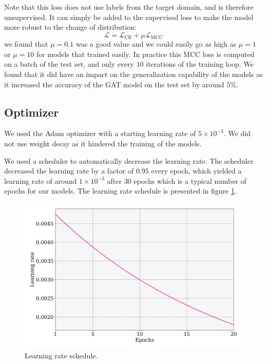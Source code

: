 \documentclass[switch, 11pt]{article}
\begin{document}
\begin{multicols}{2}
    Note that this loss does not use labels from the target domain, and is therefore unsupervised. It can simply be added to the supervised loss to make the model more robust to the change of distribution:
    \begin{equation}
        \mathcal{L} = \mathcal{L}_{\text{CE}} + \mu\mathcal{L}_{\text{MCC}}
    \end{equation}
    we found that $\mu=0.1$ was a good value and we could easily go as high as $\mu=1$ or $\mu=10$ for models that trained easily. In practice this MCC loss is computed on a batch of the test set, and only every $10$ iterations of the training loop. We found that it did have an impact on the generalization capability of the models as it increased the accuracy of the GAT model on the test set by around $5\%$.

    \subsection{Optimizer}

    We used the Adam optimizer with a starting learning rate of $5\times10^{-3}$. We did not use weight decay as it hindered the training of the models.

    We used a scheduler to automatically decrease the learning rate. The scheduler decreased the learning rate by a factor of $0.95$ every epoch, which yielded a learning rate of around $1\times10^{-3}$ after $30$ epochs which is a typical number of epochs for our models. The learning rate schedule is presented in figure \ref{fig:learning_rate}.

    \begin{figure}[H]
        \centering
        \includegraphics[width=\columnwidth]{figures/learning_rate.png}
        \caption{Learning rate schedule.}
        \label{fig:learning_rate}
    \end{figure}


\end{multicols}
\end{document}
